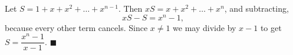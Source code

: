 Let $S=1+x+x^2+\dots+x^{n-1}$. Then $xS=x+x^2+\dots+x^n$, and subtracting,
\[
xS-S=x^n-1,
\]
because every other term cancels. Since $x\ne1$ we may divide by $x-1$ to get $S=\dfrac{x^n-1}{x-1}$. $\blacksquare$
